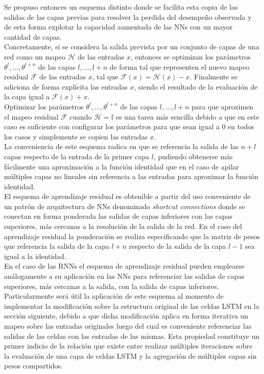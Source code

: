 \documentclass{article}
\begin{document}
	Se propuso entonces un esquema distinto donde se facilita esta copia de las salidas de las capas previas para resolver la perdida del desempeño observada y de esta forma explotar la capacidad aumentada de las NNs con un mayor cantidad de capas.\\
	Concretamente, si se considera la salida prevista por un conjunto de capas de una red como un mapeo $\mathcal{H}$ de las entradas $x$, entonces se optimizan los parámetros $\theta^l, ... , \theta^{l+n}$ de las capas $l, ... , l+n$ de forma tal que representen el nuevo mapeo residual $\mathcal{F}$ de las entradas $x$, tal que $\mathcal{F}(x) = \mathcal{H}(x) - x$. Finalmente se adiciona de forma explícita las entradas $x$, siendo el resultado de la evaluación de la capa igual a $\mathcal{F}(x) + x$.\\
	Optimizar los parámetros $\theta^l, ... , \theta^{l+n}$ de las capas $l, ... , l+n$ para que aproximen el mapeo residual $\mathcal{F}$ cuando $\mathcal{H} = \mathbb{I}$ es una tarea más sencilla debido a que en este caso es suficiente con configurar los parámetros para que sean igual a $0$ en todos los casos y simplemente se copien las entradas $x$\cite{28ResidualLearning}.\\
	La conveniencia de este esquema radica en que se referencia la salida de las $n+l$ capas respecto de la entrada de la primer capa $l$, pudiendo obtenerse más fácilmente una aproximación a la función identidad que en el caso de apilar múltiples capas no lineales sin referencia a las entradas para aproximar la función identidad.\\
	
	El esquema de aprendizaje residual es obtenible a partir del uso conveniente de un patrón de arquitectura de NNs denominado \textit{shortcut connections}\cite{29ShortcutConnections} donde se conectan en forma ponderada las salidas de capas inferiores con las capas superiores, más cercanas a la resolución de la salida de la red. En el caso del aprendizaje residual la ponderación se realiza especificando que la matriz de pesos que referencia la salida de la capa $l+n$ respecto de la salida de la capa $l-1$ sea igual a la identidad.\\
	
	En el caso de las RNNs el esquema de aprendizaje residual pueden emplearse análogamente a su aplicación en las NNs para referenciar las salidas de capas superiores, más cercanas a la salida, con la salida de capas inferiores.\\
	Particularmente será útil la aplicación de este esquema al momento de implementar la modificación sobre la estructura original de las celdas LSTM en la sección siguiente, debido a que dicha modificación aplica en forma iterativa un mapeo sobre las entradas originales luego del cual es conveniente referenciar las salidas de las celdas con las entradas de las mismas. Esta propiedad constituye un primer indicio de la relación que existe entre realizar múltiples iteraciones sobre la evaluación de una capa de celdas LSTM y la agregación de múltiples capas sin pesos compartidos.
	
\end{document}
